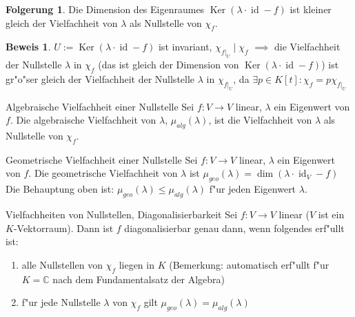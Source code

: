 \documentclass[fontsize=11pt,paper=a4,BCOR=0mm,DIV=11,automark,headsepline]{scrbook}
\DeclareMathOperator{\mKer}{Ker}
\DeclareMathOperator{\mId}{id}
\theoremstyle{remark}
\theoremstyle{definition}
\newtheorem{folgerung}{Folgerung}
\theoremstyle{proof}
\newtheorem*{prof}{Beweis}
\theoremstyle{remark}
\begin{document}
\begin{folgerung}
  Die Dimension des Eigenraumes \(\mKer(\lambda\cdot\mId - f)\) ist kleiner gleich der Vielfachheit von \(\lambda\) als Nullstelle von \(\chi_f\).
\end{folgerung}

\begin{prof}
  \(U:= \mKer(\lambda\cdot\mId - f)\) ist invariant,
  \(\chi_{f|_U} \mid \chi_f\) \(\implies\) die Vielfachheit der Nullstelle \(\lambda\) in \(\chi_f\) (das ist gleich der Dimension von \(\mKer(\lambda\cdot\mId - f)\)) ist gr"o"ser gleich der Vielfachheit der Nullstelle \(\lambda\) in \(\chi_{f|_U}\), da \(\exists p\in K[t]: \chi_f = p\chi_{f|_U}\)
\end{prof}

\begin{definition}{Algebraische Vielfachheit einer Nullstelle}{}
  Sei \(f: V\to V\) linear, $\lambda$ ein Eigenwert von $f$. Die algebraische Vielfachheit von \(\lambda\), \(\mu_{alg}(\lambda)\), ist die Vielfachheit von \(\lambda\) als Nullstelle von \(\chi_f\).
\end{definition}

\begin{definition}{Geometrische Vielfachheit einer Nullstelle}{}
  Sei \(f:V \to V\) linear, $\lambda$ ein Eigenwert von $f$. Die geometrische Vielfachheit von \(\lambda\) ist \(\mu_{geo}(\lambda) = \dim(\lambda\cdot\mId_V - f)\)
  Die Behauptung oben ist: \(\mu_{geo}(\lambda) \leq \mu_{alg}(\lambda)\) f"ur jeden Eigenwert \(\lambda\).
\end{definition}

\begin{satz}{Vielfachheiten von Nullstellen, Diagonalisierbarkeit}{}
  Sei \(f: V\to V\) linear (\(V\) ist ein \(K\)-Vektorraum). Dann ist \(f\) diagonalisierbar genau dann, wenn folgendes erf"ullt ist:
  \begin{enumerate}
  \item alle Nullstellen von \(\chi_f\) liegen in \(K\) (Bemerkung: automatisch erf"ullt f"ur \(K = \mathbb{C}\) nach dem Fundamentalsatz der Algebra)
  \item f"ur jede Nullstelle \(\lambda\) von \(\chi_f\) gilt \(\mu_{geo}(\lambda) = \mu_{alg}(\lambda)\)
  \end{enumerate}
\end{satz}
\end{document}
